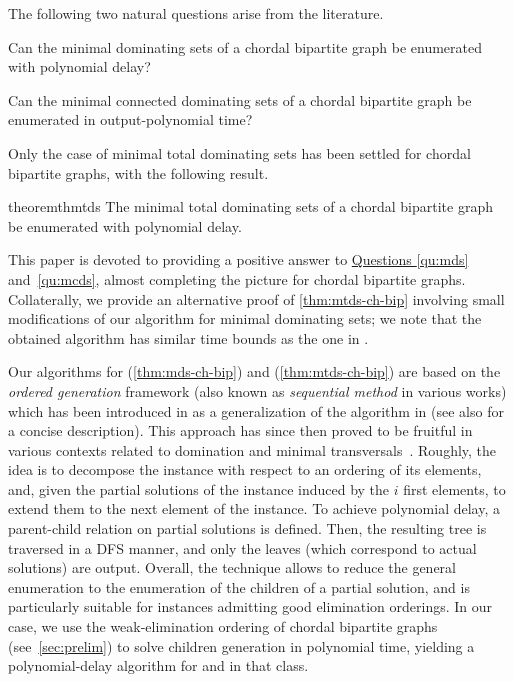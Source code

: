 The following two natural questions arise from the literature.

\begin{question}\label{qu:mds}
    Can the minimal dominating sets of a chordal bipartite graph be enumerated with polynomial delay?
\end{question}

\begin{question}\label{qu:mcds}
    Can the minimal connected dominating sets of a chordal bipartite graph be enumerated in output-polynomial time?
\end{question}

Only the case of minimal total dominating sets has been settled for chordal bipartite graphs, with the following result.

\begin{restatable}{theorem}{thmtds}
\label{thm:mtds-ch-bip}
    The minimal total dominating sets of a chordal bipartite graph be enumerated with polynomial delay.
\end{restatable}

 This paper is devoted to providing a positive answer to 
\hyperref[prop:mds-closed-neighborhoods]{Questions \ref*{qu:mds}} and~\ref{qu:mcds},
almost completing the picture for chordal bipartite graphs. 
Collaterally, we provide an alternative proof of \autoref{thm:mtds-ch-bip} involving small modifications of our algorithm for minimal dominating sets; we note that the obtained algorithm has similar time bounds as the one in \cite{golovach2016enumerating}.

Our algorithms for \domenum{} (\autoref{thm:mds-ch-bip}) and \tdomenum{} (\autoref{thm:mtds-ch-bip}) are based on the \emph{ordered generation} framework (also known as \emph{sequential method} in various works) which has been introduced in \cite{eiter2003new} as a generalization of the algorithm in \cite{tsukiyama1977new} (see also \cite{johnson1988generating} for a concise description). 
This approach has since then proved to be fruitful in various contexts related to domination and minimal transversals~\cite{conte2019irredundant,bonamy2020kt,defrain2021translating}.
Roughly, the idea is to decompose the instance with respect to an ordering of its elements, and, given the partial solutions of the instance induced by the $i$ first elements, to extend them to the next element of the instance. 
To achieve polynomial delay, a parent-child relation on partial solutions is defined. 
Then, the resulting tree is traversed in a DFS manner, and only the leaves (which correspond to actual solutions) are output.
Overall, the technique allows to reduce the general enumeration to the enumeration of the children of a partial solution, and is particularly suitable for instances admitting good elimination orderings.
In our case, we use the weak-elimination ordering of chordal bipartite graphs (see~\autoref{sec:prelim}) to solve children generation in polynomial time, yielding a polynomial-delay algorithm for \domenum{} and \tdomenum{} in that class.

